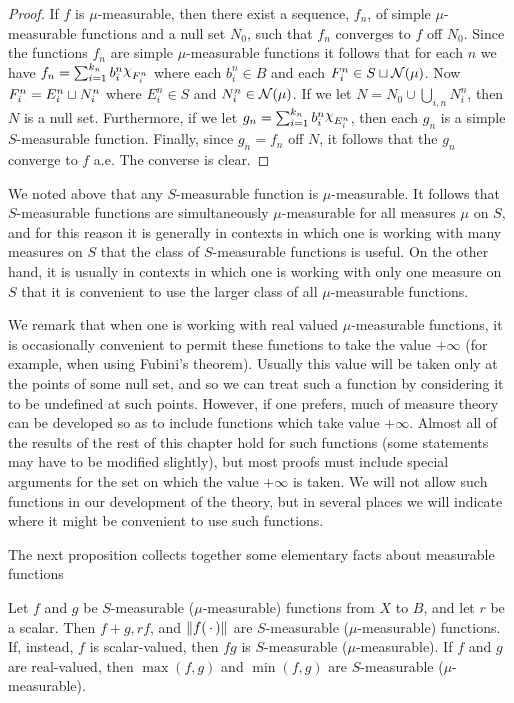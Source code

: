 \begin{proof}
If $f$ is $\mu$-measurable, then there exist a sequence, $f_n$, of simple $\mu$-measurable functions and a null set $N_0$, such that $f_n$ converges to $f$ off $N_0$. Since the functions $f_n$ are simple $\mu$-measurable functions it follows that for each $n$ we have $f_n=\sum_{i=1}^{k_n}b_i^n\idf{F_i^n}$ where each $b_i^n\in B$ and each $F_i^n\in S\sqcup{\cal N}(\mu)$. Now $F_i^n=E_i^n\sqcup N_i^n$ where $E_i^n\in S$ and $N_i^n\in{\cal N}(\mu)$. If we let $N=N_0\cup\bigcup_{i, n} N_i^n$, then $N$ is a null set. Furthermore, if we let $g_n=\sum_{i=1}^{k_n}b_i^n\idf{E_i^n}$, then each $g_n$ is a simple $S$-measurable function. Finally, since $g_n=f_n$ off $N$, it follows that the $g_n$ converge to $f$ a.e. The converse is clear.
\end{proof}

We noted above that any $S$-measurable function is $\mu$-measurable. It follows that $S$-measurable functions are simultaneously $\mu$-measurable for all measures $\mu$ on $S$, and for this reason it is generally in contexts in which one is working with many measures on $S$ that the class of $S$-measurable functions is useful. On the other hand, it is usually in contexts in which one is working with only one measure on $S$ that it is convenient to use the larger class of all $\mu$-measurable functions.

We remark that when one is working with real valued $\mu$-measurable functions, it is occasionally convenient to permit these functions to take the value $+\infty$ (for example, when using Fubini's theorem). Usually this value will be taken only at the points of some null set, and so we can treat such a function by considering it to be undefined at such points. However, if one prefers, much of measure theory can be developed so as to include functions which take value $+\infty$. Almost all of the results of the rest of this chapter hold for such functions (some statements may have to be modified slightly), but most proofs must include special arguments for the set on which the value $+\infty$ is taken. We will not allow such functions in our development of the theory, but in several places we will indicate where it might be convenient to use such functions.

The next proposition collects together some elementary facts about measurable functions

\begin{proposition}
\label{prop:sum product of meas function}
Let $f$ and $g$ be $S$-measurable ($\mu$-measurable) functions from $X$ to $B$, and let $r$ be a scalar. Then $f+g, rf$, and $\norm{f(\,\cdot\,)}$ are $S$-measurable ($\mu$-measurable) functions. If, instead, $f$ is scalar-valued, then $fg$ is $S$-measurable ($\mu$-measurable). If $f$ and $g$ are real-valued, then $\max(f, g)$ and $\min(f, g)$ are $S$-measurable ($\mu$-measurable).
\end{proposition}

